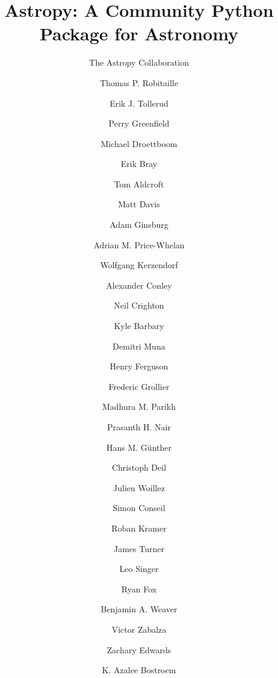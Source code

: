 \documentclass[traditabstract]{aa}
\begin{document}



\title{Astropy: A Community Python Package for Astronomy}




\author{
The Astropy Collaboration
  \and
Thomas P. Robitaille\inst{\ref{inst:mpia}}  %
  \and
Erik J. Tollerud\inst{\ref{inst:yale}, \ref{inst:hubble}}  %
  \and
Perry Greenfield\inst{\ref{inst:stsci}}  %
  \and
Michael Droettboom\inst{\ref{inst:stsci}}  %
  \and
Erik Bray\inst{\ref{inst:stsci}}  %
  \and
Tom Aldcroft\inst{\ref{inst:cfa}}  %
  \and
Matt Davis\inst{\ref{inst:stsci}}  %
  \and
Adam Ginsburg\inst{\ref{inst:colorado}}  %
  \and
Adrian M. Price-Whelan\inst{\ref{inst:columbia}}  %
  \and
Wolfgang Kerzendorf\inst{\ref{inst:toronto}}  %
  \and
Alexander Conley\inst{\ref{inst:colorado}}
  \and
Neil Crighton\inst{\ref{inst:mpia}}  %
  \and
Kyle Barbary\inst{\ref{inst:argonne}}  %
  \and
Demitri Muna\inst{\ref{inst:osu}}  %
  \and
Henry Ferguson\inst{\ref{inst:stsci}}
  \and
Frederic Grollier
  \and
Madhura M. Parikh\inst{\ref{inst:surat}}  %
  \and
Prasanth H. Nair\inst{\ref{inst:freelance}}  %
  \and
Hans M. G\"unther\inst{\ref{inst:cfa}}  %
  \and
Christoph Deil\inst{\ref{inst:mpik}}  %
  \and
Julien Woillez\inst{\ref{inst:eso_garching}}  %
  \and
Simon Conseil\inst{\ref{inst:oamp}}
  \and
Roban Kramer\inst{\ref{inst:eth}}  %
  \and
James Turner\inst{\ref{inst:gemini_s}}  %
  \and
Leo Singer\inst{\ref{inst:ligo}}  %
  \and
Ryan Fox\inst{\ref{inst:freelance}}  %
  \and
Benjamin A. Weaver\inst{\ref{inst:nyu}}  %
  \and
Victor Zabalza\inst{\ref{inst:mpik}}  %
  \and
Zachary Edwards\inst{\ref{inst:louisiana}}  %
  \and
K. Azalee Bostroem\inst{\ref{inst:stsci}}  %
}
\end{document}
